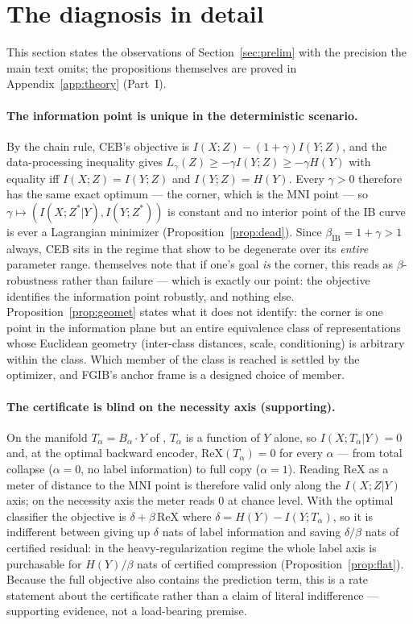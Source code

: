 \documentclass{article} %
\newcommand{\ReX}{\mathrm{ReX}}
\begin{document}
\section{The diagnosis in detail}
\label{app:prelim-detail}

This section states the observations of Section~\ref{sec:prelim} with the precision
the main text omits; the propositions themselves are proved in
Appendix~\ref{app:theory} (Part~I).

\paragraph{The information point is unique in the deterministic scenario.}
By the chain rule, CEB's objective is $I(X;Z) - (1+\gamma)I(Y;Z)$, and the
data-processing inequality gives
$L_\gamma(Z) \ge -\gamma I(Y;Z) \ge -\gamma H(Y)$ with equality iff
$I(X;Z) = I(Y;Z)$ and $I(Y;Z) = H(Y)$. Every $\gamma > 0$ therefore has the same exact
optimum --- the corner, which is the MNI point --- so
$\gamma \mapsto (I(X;Z^*|Y), I(Y;Z^*))$ is constant and no interior point of the IB curve
is ever a Lagrangian minimizer (Proposition~\ref{prop:dead}). Since
$\beta_{\mathrm{IB}} = 1+\gamma > 1$ always, CEB sits in the regime that
\citet{kolchinsky2019caveats} show to be degenerate over its \emph{entire} parameter
range. \citet{kolchinsky2019caveats} themselves note that if one's goal \emph{is} the
corner, this reads as $\beta$-robustness rather than failure --- which is exactly our
point: the objective identifies the information point robustly, and nothing else.
Proposition~\ref{prop:geomet} states what it does not identify: the corner is one point
in the information plane but an entire equivalence class of representations whose
Euclidean geometry (inter-class distances, scale, conditioning) is arbitrary within
the class. Which member of the class is reached is settled by the optimizer, and FGIB's
anchor frame is a designed choice of member.

\paragraph{The certificate is blind on the necessity axis (supporting).}
On the manifold $T_\alpha = B_\alpha \cdot Y$ of \citet{kolchinsky2019caveats}, $T_\alpha$
is a function of $Y$ alone, so $I(X;T_\alpha|Y) = 0$ and, at the optimal backward encoder,
$\ReX(T_\alpha) = 0$ for every $\alpha$ --- from total collapse ($\alpha = 0$, no label
information) to full copy ($\alpha = 1$). Reading $\ReX$ as a meter of distance to the MNI
point is therefore valid only along the $I(X;Z|Y)$ axis; on the necessity axis the meter
reads $0$ at chance level. With the optimal classifier the objective is
$\delta + \beta\,\ReX$ where $\delta = H(Y) - I(Y;T_\alpha)$, so it is indifferent between
giving up $\delta$ nats of label information and saving $\delta/\beta$ nats of certified
residual: in the heavy-regularization regime the whole label axis is purchasable for
$H(Y)/\beta$ nats of certified compression (Proposition~\ref{prop:flat}). Because the
full objective also contains the prediction term, this is a rate statement about the
certificate rather than a claim of literal indifference --- supporting evidence, not a
load-bearing premise.
\end{document}
